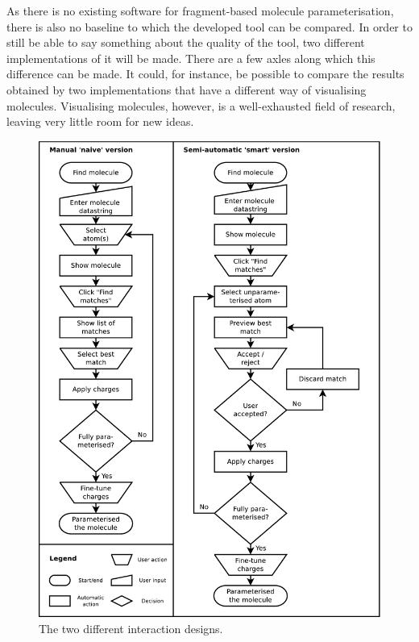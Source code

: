 
As there is no existing software for fragment-based molecule parameterisation, there is also no baseline to which the developed tool can be compared. In order to still be able to say something about the quality of the tool, two different implementations of it will be made. There are a few axles along which this difference can be made. It could, for instance, be possible to compare the results obtained by two implementations that have a different way of visualising molecules. Visualising molecules, however, is a well-exhausted field of research, leaving very little room for new ideas.

\begin{figure}[h!]
\begin{center}
\includegraphics[width=.9\textwidth]{img/complete_id.pdf}
\caption{The two different interaction designs.}
\end{center}
\end{figure}

